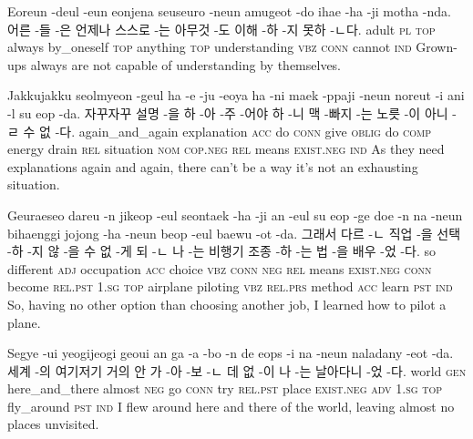 \begin{example}
\tgl
		{Eoreun -deul -eun eonjena seuseuro -neun amugeot -do ihae -ha -ji motha -nda.}
		{어른 -들 -은 언제나 스스로 -는 아무것 -도 이해 -하 -지 못하 -ㄴ다.}
		{adult	\textsc{pl}	\textsc{top}	always	by\_oneself	\textsc{top}	anything	\textsc{top}	understanding	\textsc{vbz}	\textsc{conn}	cannot	\textsc{ind}}
		{Grown-ups always are not capable of understanding by themselves.}
\end{example}

\begin{example}
\tgl
		{Jakkujakku seolmyeon -geul ha -e -ju -eoya ha -ni maek -ppaji -neun noreut -i ani -l su eop -da.}
		{자꾸자꾸 설명 -을 하 -아 -주 -어야 하 -니 맥 -빠지 -는 노릇 -이 아니 -ㄹ 수 없 -다.}
		{again\_and\_again	explanation	\textsc{acc}	do	\textsc{conn}	give	\textsc{oblig}	do	\textsc{comp}	energy	drain	\textsc{rel}	situation	\textsc{nom}	\textsc{cop.neg}	\textsc{rel}	means	\textsc{exist.neg}	\textsc{ind}}
		{As they need explanations again and again, there can't be a way it's not an exhausting situation.}
\end{example}

\begin{example}
\tgl
		{Geuraeseo dareu -n jikeop -eul seontaek -ha -ji an -eul su eop -ge doe -n na -neun bihaenggi jojong -ha -neun beop -eul baewu -ot -da.}
		{그래서 다르 -ㄴ 직업 -을 선택 -하 -지 않 -을 수 없 -게 되 -ㄴ 나 -는 비행기 조종 -하 -는 법 -을 배우 -었 -다.}
		{so	different	\textsc{adj}	occupation	\textsc{acc}	choice	\textsc{vbz}	\textsc{conn}	\textsc{neg}	\textsc{rel}	means	\textsc{exist.neg}	\textsc{conn}	become	\textsc{rel.pst}	\textsc{1.sg}	\textsc{top}	airplane	piloting	\textsc{vbz}	\textsc{rel.prs}	method	\textsc{acc}	learn	\textsc{pst} \textsc{ind}}
		{So, having no other option than choosing another job, I learned how to pilot a plane.}
\end{example}

\begin{example}
\tgl
		{Segye -ui yeogijeogi geoui an ga -a -bo -n de eops -i na -neun naladany -eot -da.}
		{세계 -의 여기저기 거의 안 가 -아 -보 -ㄴ 데 없 -이 나 -는 날아다니 -었 -다.}
		{world	\textsc{gen}	here\_and\_there	almost	\textsc{neg}	go	\textsc{conn}	try	\textsc{rel.pst}	place	\textsc{exist.neg}	\textsc{adv}	\textsc{1.sg}	\textsc{top}	fly\_around	\textsc{pst} \textsc{ind}}
		{I flew around here and there of the world, leaving almost no places unvisited.}
\end{example}

